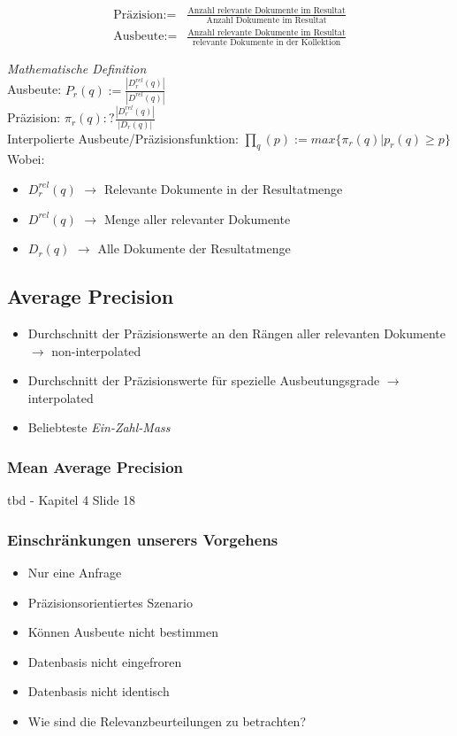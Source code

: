 \documentclass{report}
\theoremstyle{definition}
\theoremstyle{example}
\begin{document}
\begin{equation}
   \begin{split}
      \text{Präzision} :=& \frac{\text{Anzahl relevante Dokumente im Resultat}}{\text{Anzahl Dokumente im Resultat}} \\
      \text{Ausbeute} :=& \frac{\text{Anzahl relevante Dokumente im Resultat}}{\text{relevante Dokumente in der Kollektion}}
   \end{split}
\end{equation}

\textit{Mathematische Definition}\\
Ausbeute: $P_r(q) := \frac{|D^{rel}_r (q)|}{|D^{rel} (q)|}$ \\
Präzision: $\pi_r (q) :? \frac{|D^{rel}_r (q)|}{|D_r (q)|}$ \\
Interpolierte Ausbeute/Präzisionsfunktion: $\prod_q (p) := max \{ \pi_r (q) | p_r (q) \geq p \}$\\
Wobei:
\begin{itemize}
   \item $D^{rel}_r (q)$ $\rightarrow$ Relevante Dokumente in der Resultatmenge
   \item $D^{rel} (q)$ $\rightarrow$ Menge aller relevanter Dokumente
   \item $D_r (q)$ $\rightarrow$ Alle Dokumente  der Resultatmenge
\end{itemize}

\subsection{Average Precision}
\begin{itemize}
   \item Durchschnitt der Präzisionswerte an den Rängen aller relevanten Dokumente $\rightarrow$ non-interpolated
   \item Durchschnitt der Präzisionswerte für spezielle Ausbeutungsgrade $\rightarrow$ interpolated
   \item Beliebteste \textit{Ein-Zahl-Mass}
\end{itemize}

\subsubsection{Mean Average Precision}

tbd - Kapitel 4 Slide 18

\subsubsection{Einschränkungen unserers Vorgehens}
\begin{itemize}
   \item Nur eine Anfrage
   \item Präzisionsorientiertes Szenario
   \item Können Ausbeute nicht bestimmen
   \item Datenbasis nicht eingefroren
   \item Datenbasis nicht identisch
   \item Wie sind die Relevanzbeurteilungen zu betrachten?
\end{itemize}
\end{document}
